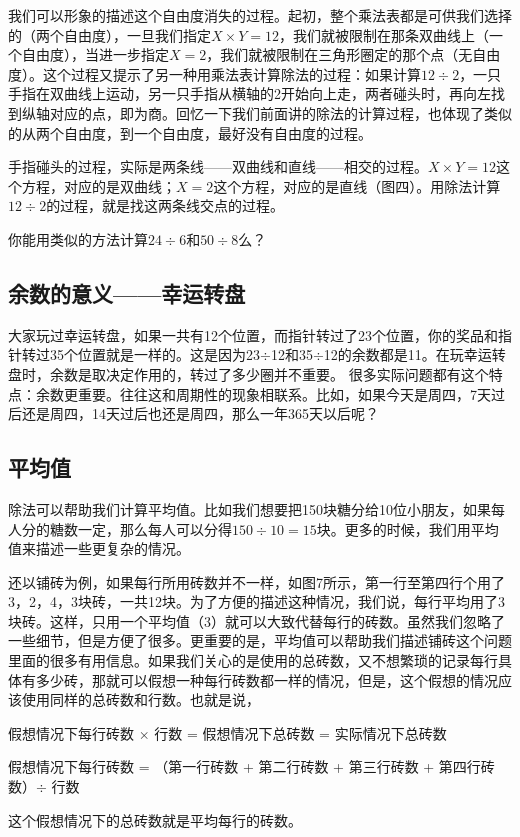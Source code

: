 我们可以形象的描述这个自由度消失的过程。起初，整个乘法表都是可供我们选择的（两个自由度），一旦我们指定$X\times Y = 12$，我们就被限制在那条双曲线上（一个自由度），当进一步指定$X=2$，我们就被限制在三角形圈定的那个点（无自由度）。这个过程又提示了另一种用乘法表计算除法的过程：如果计算$12\div2$，一只手指在双曲线上运动，另一只手指从横轴的2开始向上走，两者碰头时，再向左找到纵轴对应的点，即为商。回忆一下我们前面讲的除法的计算过程，也体现了类似的从两个自由度，到一个自由度，最好没有自由度的过程。

手指碰头的过程，实际是两条线——双曲线和直线——相交的过程。$X\times Y = 12$这个方程，对应的是双曲线；$X = 2$这个方程，对应的是直线（图四）。用除法计算$12\div2$的过程，就是找这两条线交点的过程。

你能用类似的方法计算$24\div6$和$50\div8$么？

\subsection{余数的意义——幸运转盘} 大家玩过幸运转盘，如果一共有12个位置，而指针转过了23个位置，你的奖品和指针转过35个位置就是一样的。这是因为23$\div$12和35$\div$12的余数都是11。在玩幸运转盘时，余数是取决定作用的，转过了多少圈并不重要。 很多实际问题都有这个特点：余数更重要。往往这和周期性的现象相联系。比如，如果今天是周四，7天过后还是周四，14天过后也还是周四，那么一年365天以后呢？

\subsection{平均值} 
除法可以帮助我们计算平均值。比如我们想要把150块糖分给10位小朋友，如果每人分的糖数一定，那么每人可以分得$150\div10=15$块。更多的时候，我们用平均值来描述一些更复杂的情况。

还以铺砖为例，如果每行所用砖数并不一样，如图7所示，第一行至第四行个用了3，2，4，3块砖，一共12块。为了方便的描述这种情况，我们说，每行平均用了3块砖。这样，只用一个平均值（3）就可以大致代替每行的砖数。虽然我们忽略了一些细节，但是方便了很多。更重要的是，平均值可以帮助我们描述铺砖这个问题里面的很多有用信息。如果我们关心的是使用的总砖数，又不想繁琐的记录每行具体有多少砖，那就可以假想一种每行砖数都一样的情况，但是，这个假想的情况应该使用同样的总砖数和行数。也就是说，

假想情况下每行砖数 $\times$ 行数 = 假想情况下总砖数 = 实际情况下总砖数

假想情况下每行砖数 = （第一行砖数 + 第二行砖数 + 第三行砖数 + 第四行砖数）$\div$ 行数

这个假想情况下的总砖数就是平均每行的砖数。


